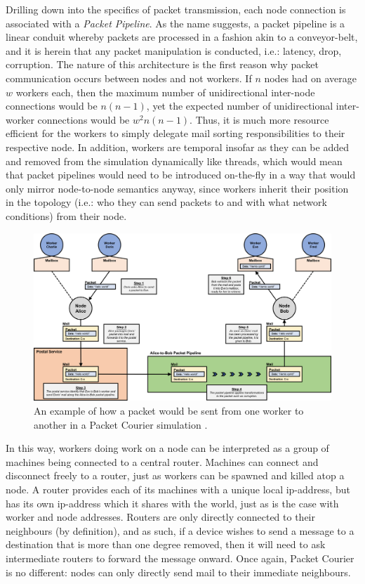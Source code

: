 Drilling down into the specifics of packet transmission, each node connection is associated with a \emph{Packet
Pipeline}. As the name suggests, a packet pipeline is a linear conduit whereby packets are processed in a fashion
akin to a conveyor-belt, and it is herein that any packet manipulation is conducted, i.e.: latency, drop, corruption.
The nature of this architecture is the first reason why packet communication occurs between nodes and not workers. If
$n$ nodes had on average $w$ workers each, then the maximum number of unidirectional inter-node connections would be
$n(n-1)$, yet the expected number of unidirectional inter-worker connections would be $w^2n(n-1)$. Thus, it is much
more resource efficient for the workers to simply delegate mail sorting responsibilities to their respective node. In
addition, workers are temporal insofar as they can be added and removed from the simulation dynamically like threads,
which would mean that packet pipelines would need to be introduced on-the-fly in a way that would only mirror
node-to-node semantics anyway, since workers inherit their position in the topology (i.e.: who they can send packets
to and with what network conditions) from their node.

\begin{figure}[!h]
    \includegraphics[width=\textwidth]{images/chapter_3_design/simulation_semantics_diagram}
    \centering
    \caption{An example of how a packet would be sent from one worker to another in a Packet Courier simulation
    .}\label{fig:chapter_3_design-simulation_semantics_diagram}
\end{figure}

In this way, workers doing work on a node can be interpreted as a group of machines being connected to a central
router. Machines can connect and disconnect freely to a router, just as workers can be spawned and killed atop a node. A
router provides each of its machines with a unique local ip-address, but has its own ip-address which it shares with
the world, just as is the case with worker and node addresses. Routers are only directly connected to their
neighbours (by definition), and as such, if a device wishes to send a message to a destination that is more than one
degree removed, then it will need to ask intermediate routers to forward the message onward. Once again, Packet
Courier is no different: nodes can only directly send mail to their immediate neighbours.

